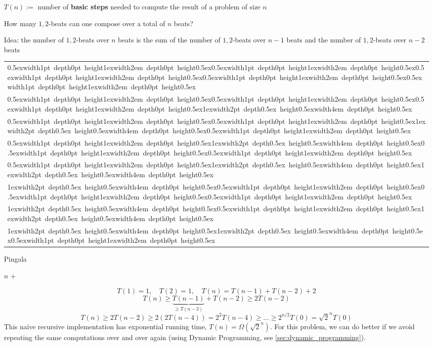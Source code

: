 $T(n) :=$ number of \textbf{basic steps} needed to compute the result of a problem of size $n$

\begin{example}
\label{ex:pingala}
How many $1,2$-beats can one compose over a total of $n$ beats?

Idea: the number of $1,2$-beats over $n$ beats is the sum of the number of $1,2$-beats over $n-1$ beats and the number of $1,2$-beats over $n-2$ beats
\def\TA{\raise0.5ex\hbox{\vrule width1pt depth0pt height1ex\vrule width2em depth0pt height0.5ex}}
\def\TAA{\raise1ex\hbox{\color{gray}\vrule width2pt depth0.5ex height0.5ex\vrule width4em depth0pt height0.5ex}}
\begin{center}
    \vspace{0em}
    \begin{tabular}[b]{l}
        \TA\hspace{1em}\TA\TA\TA\TA \\
        \TA\hspace{1em}\TA\TA\TAA \\
        \TA\hspace{1em}\TA\TAA\TA \\
        \TA\hspace{1em}\TAA\TA\TA \\
        \TA\hspace{1em}\TAA\TAA \\
    
        \TAA\hspace{1em}\TA\TA\TA \\
        \TAA\hspace{1em}\TA\TAA \\
        \TAA\hspace{1em}\TAA\TA \\
      \end{tabular}
\end{center}
\begin{algorithm}[htb] %
    \caption{Pingala}
    \begin{algorithmic}[1]
     
            \State \Return $n$
        \EndIf
        \State \Return {} + 
    \EndFunction
    \end{algorithmic}
\end{algorithm}


\vspace{-0.1em}
\[
T(1) = 1, \quad T(2) = 1, \quad T(n) = T(n-1) + T(n-2) + 2
\]
\[
 T(n) \geq \underbrace{T(n-1)}_{\geq T(n-2)} + T(n-2)  \geq 2T(n-2)
\]
\[
T(n) \geq 2T(n-2) \geq 2(2T(n-4)) = 2^2T(n-4) \geq \ldots \geq 2^{n/2}T(0) = \sqrt{2}^n T(0)  
\]
This naïve recursive implementation has exponential running time, $T(n) = \Omega(\sqrt{2}^n)$.
For this problem, we can do better if we avoid repeating the same computations over and over again (using Dynamic Programming, see \ref{sec:dynamic_programming}).
\end{example}


